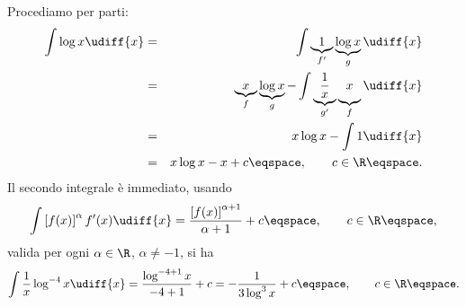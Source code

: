 \begin{Solution}
Procediamo per parti:
\begin{eqnarray*}
\int \log x \udiff{x} &=& \int \underbrace{1}_{f^{\prime}} \underbrace{\log x }_{g}
\udiff{x} \\
&=& \underbrace{x}_{f} \underbrace{\log x }_{g} - \int \underbrace{\frac{1}{x}
}_{g'} \underbrace{x \vphantom{\frac{1}{x}}}_{f} \udiff{x} \\
&=& x \log x - \int 1 \udiff{x} \\
&=& x \log x - x + c \eqspace, \qquad c \in\R \eqspace .
\end{eqnarray*}
Il secondo integrale \`e immediato, usando
\begin{displaymath}
\int  \left[ f(x)\right] ^{\alpha } f^{\prime}(x) \udiff{x} = \frac{\left[
f(x)\right]^{\alpha+1}}{\alpha +1 } +  c \eqspace , \qquad c\in\R \eqspace, 
\end{displaymath}
valida per ogni $\alpha \in\R$, $\alpha \neq -1$, si ha
\begin{displaymath}
\int \frac{1}{x} \log^{-4} x \udiff{x} = \frac{\log^{-4+1} x}{-4+1} + c 
= - \frac{1}{3\log^{3} x } + c \eqspace , \qquad c\in\R \eqspace. 
\end{displaymath}
\end{Solution}


